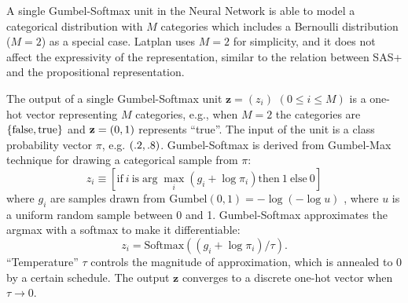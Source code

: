 
A single Gumbel-Softmax unit in the Neural Network is able to model a categorical distribution with $M$ categories
which includes a Bernoulli distribution ($M=2$) as a special case.
Latplan uses $M=2$ for simplicity, and it does not affect the expressivity of the representation,
similar to the relation between SAS+ and the propositional representation.

The output of a single Gumbel-Softmax unit $\mathbf{z}=(z_i)$ $(0\leq i \le M)$ is a one-hot vector representing $M$ categories, e.g.,
when $M=2$ the categories are ${\left\{\text{false},\text{true}\right\}}$ and $\mathbf{z}={\left(0,1\right)}$ represents ``true''.
The input of the unit is a class probability vector $\pi$, e.g. ${\left(.2,.8\right)}$.
% 
Gumbel-Softmax is derived from Gumbel-Max technique \cite{maddison2014sampling} for drawing a categorical sample from $\pi$:
\[
z_i \equiv [ \text{if}\ i\ \text{is} \arg \max_i (g_i+\log \pi_i) \text{then}\ 1\ \text{else}\ 0 ]
\]
where $g_i$ are samples drawn from
 $\text{Gumbel}(0,1) =-\log (-\log u)$ \cite{gumbel1954statistical}, where
$u$ is a uniform random sample between 0 and 1. %
Gumbel-Softmax approximates the argmax with a softmax to make it differentiable:
\[
z_i = \text{Softmax}((g_i+\log \pi_i)/\tau).
\]
``Temperature'' $\tau$ controls the magnitude of approximation, which is annealed to 0 by a certain schedule.
The output $\mathbf{z}$ converges to a discrete one-hot vector when $\tau\rightarrow 0$.

